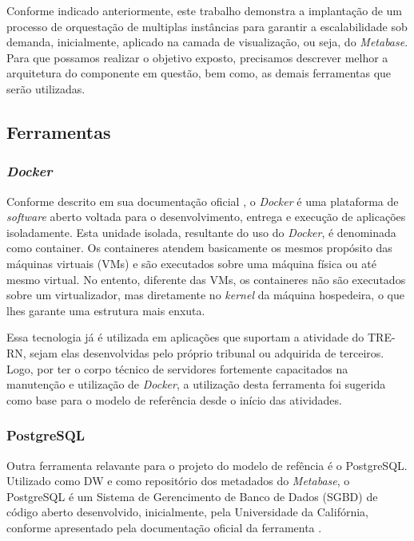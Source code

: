 Conforme indicado anteriormente, este trabalho demonstra a implantação de um processo de orquestação de multiplas instâncias para garantir a escalabilidade sob demanda, inicialmente, aplicado na camada de visualização, ou seja, do \textit{Metabase}. Para que possamos realizar o objetivo exposto, precisamos descrever melhor a arquitetura do componente em questão, bem como, as demais ferramentas que serão utilizadas. 

\subsection{Ferramentas}

\subsubsection{\textit{Docker}}

Conforme descrito em sua documentação oficial \cite{dockerDoc}, o \textit{Docker} é uma plataforma de \textit{software} aberto voltada para o desenvolvimento, entrega e execução de aplicações isoladamente. Esta unidade isolada, resultante do uso do \textit{Docker}, é denominada como container. Os containeres atendem basicamente os mesmos propósito das máquinas virtuais (VMs) e são executados sobre uma máquina física ou até mesmo virtual. No entento, diferente das VMs, os containeres não são executados sobre um virtualizador, mas diretamente no \textit{kernel} da máquina hospedeira, o que lhes garante uma estrutura mais enxuta.

Essa tecnologia já é utilizada em aplicações que suportam a atividade do TRE-RN, sejam elas desenvolvidas pelo próprio tribunal ou adquirida de terceiros. Logo, por ter o corpo técnico de servidores fortemente capacitados na manutenção e utilização de \textit{Docker}, a utilização desta ferramenta foi sugerida como base para o modelo de referência desde o início das atividades.

\subsubsection{PostgreSQL}

Outra ferramenta relavante para o projeto do modelo de refência é o PostgreSQL. Utilizado como DW e como repositório dos metadados do \textit{Metabase}, o PostgreSQL é um Sistema de Gerencimento de Banco de Dados (SGBD) de código aberto desenvolvido, inicialmente, pela Universidade da Califórnia, conforme apresentado pela documentação oficial da ferramenta \cite{postgresDoc}.

